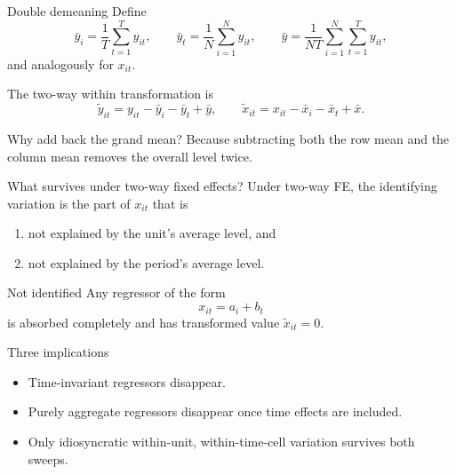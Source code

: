 \documentclass[10pt]{beamer}
\begin{document}
\begin{frame}{Double demeaning}
\label{slide:double}
\small
Define
\[
\bar{y}_i = \frac{1}{T}\sum_{t=1}^T y_{it},
\qquad
\bar{y}_t = \frac{1}{N}\sum_{i=1}^N y_{it},
\qquad
\bar{y} = \frac{1}{NT}\sum_{i=1}^N \sum_{t=1}^T y_{it},
\]
and analogously for $x_{it}$.

\pause
The two-way within transformation is
\[
\tilde{y}_{it} = y_{it} - \bar{y}_i - \bar{y}_t + \bar{y},
\qquad
\tilde{x}_{it} = x_{it} - \bar{x}_i - \bar{x}_t + \bar{x}.
\]

\begin{block}{Why add back the grand mean?}
Because subtracting both the row mean and the column mean removes the overall level twice.
\end{block}

\hfill\hyperlink{app:twfeproof}{}
\end{frame}

\begin{frame}{What survives under two-way fixed effects?}
\label{slide:twfevariation}
\small
Under two-way FE, the identifying variation is the part of $x_{it}$ that is
\begin{enumerate}
  \item not explained by the unit's average level, and
  \item not explained by the period's average level.
\end{enumerate}

\pause
\begin{block}{Not identified}
Any regressor of the form
\[
x_{it} = a_i + b_t
\]
is absorbed completely and has transformed value $\tilde{x}_{it}=0$.
\end{block}

\pause
\begin{exampleblock}{Three implications}
\begin{itemize}
  \item Time-invariant regressors disappear.
  \item Purely aggregate regressors disappear once time effects are included.
  \item Only idiosyncratic within-unit, within-time-cell variation survives both sweeps.
\end{itemize}
\end{exampleblock}
\end{frame}
\end{document}
